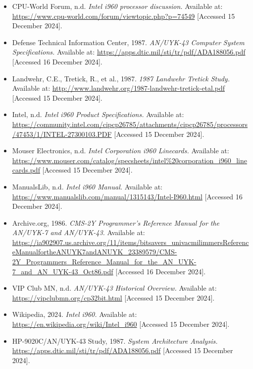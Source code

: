 \documentclass{article}
\begin{document}
\begin{itemize}
\item CPU-World Forum, n.d. \textit{Intel i960 processor discussion.} Available at: \url{https://www.cpu-world.com/forum/viewtopic.php?p=74549} [Accessed 15 December 2024].
\item Defense Technical Information Center, 1987. \textit{AN/UYK-43 Computer System Specifications.} Available at: \url{https://apps.dtic.mil/sti/tr/pdf/ADA188056.pdf} [Accessed 16 December 2024].

\item Landwehr, C.E., Tretick, R., et al., 1987. \textit{1987 Landwehr Tretick Study.} Available at: \url{http://www.landwehr.org/1987-landwehr-tretick-etal.pdf} [Accessed 15 December 2024].

\item Intel, n.d. \textit{Intel i960 Product Specifications.} Available at: \url{https://community.intel.com/cipcp26785/attachments/cipcp26785/processors/47453/1/INTEL-27300103.PDF} [Accessed 15 December 2024].

\item Mouser Electronics, n.d. \textit{Intel Corporation i960 Linecards.} Available at: \url{https://www.mouser.com/catalog/specsheets/intel%20corporation_i960_linecards.pdf} [Accessed 15 December 2024].

\item ManualsLib, n.d. \textit{Intel i960 Manual.} Available at: \url{https://www.manualslib.com/manual/1315143/Intel-I960.html} [Accessed 16 December 2024].

\item Archive.org, 1986. \textit{CMS-2Y Programmer's Reference Manual for the AN/UYK-7 and AN/UYK-43.} Available at: \url{https://ia902907.us.archive.org/11/items/bitsavers_univacmilimmersReferenceManualfortheANUYK7andANUYK_23389579/CMS-2Y_Programmers_Reference_Manual_for_the_AN_UYK-7_and_AN_UYK-43_Oct86.pdf} [Accessed 16 December 2024].

\item VIP Club MN, n.d. \textit{AN/UYK-43 Historical Overview.} Available at: \url{https://vipclubmn.org/cp32bit.html} [Accessed 15 December 2024].

\item Wikipedia, 2024. \textit{Intel i960.} Available at: \url{https://en.wikipedia.org/wiki/Intel_i960} [Accessed 15 December 2024].

\item HP-9020C/AN/UYK-43 Study, 1987. \textit{System Architecture Analysis.} \url{https://apps.dtic.mil/sti/tr/pdf/ADA188056.pdf} [Accessed 15 December 2024].

\end{itemize}
\end{document}
